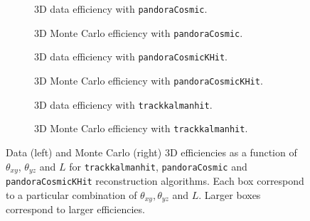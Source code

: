 \documentclass[a4paper]{scrartcl}
\begin{document}
\begin{figure}[htbp]
  \begin{subfigure}{0.5\textwidth}
    \caption{3D data efficiency with \texttt{pandoraCosmic}.} \label{fig:pandora_3D}
  \end{subfigure}
  \hspace*{\fill}
  \begin{subfigure}{0.5\textwidth}
    \caption{3D Monte Carlo efficiency with \texttt{pandoraCosmic}.}\label{fig:pandora_3D_mc}
  \end{subfigure}
  \begin{subfigure}{0.5\textwidth}
    \caption{3D data efficiency with \texttt{pandoraCosmicKHit}.} \label{fig:pandoraKHit_3D}
  \end{subfigure}
  \hspace*{\fill}
  \begin{subfigure}{0.5\textwidth}
    \caption{3D Monte Carlo efficiency with \texttt{pandoraCosmicKHit}.}\label{fig:pandoraKHit_3D_mc}
  \end{subfigure}
  \begin{subfigure}{0.5\textwidth}
    \caption{3D data efficiency with \texttt{trackkalmanhit}.} \label{fig:tk_3D}
  \end{subfigure}
  \hspace*{\fill}
  \begin{subfigure}{0.5\textwidth}
    \caption{3D Monte Carlo efficiency with \texttt{trackkalmanhit}.}\label{fig:tk_3D_mc}
  \end{subfigure}
  \caption{Data (left) and Monte Carlo (right) 3D efficiencies  as a function of $\theta_{xy}$, $\theta_{yz}$ and $L$ for \texttt{track\-kal\-man\-hit}, \texttt{pan\-do\-ra\-Co\-smic} and \texttt{pan\-do\-ra\-Co\-smicKHit} reconstruction algorithms. Each box correspond to a particular combination of $\theta_{xy}, \theta_{yz}$ and $L$. Larger boxes correspond to larger efficiencies.} \label{fig:3Deff}
\end{figure}
\end{document}

